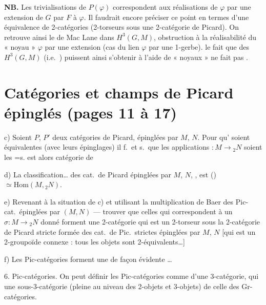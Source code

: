 \documentclass[11pt,a4paper]{article}
\begin{document}
\textbf{NB.} Les trivialisations de $P(\varphi)$ correspondent aux
réalisations de $\varphi$ par une extension de $G$ par $F$
 à $\varphi$. Il faudrait encore préciser ce point
en termes d'une équivalence de 2-catégories (2-torseurs sous une
2-catégorie de Picard). On retrouve ainsi le  de Mac Lane
dans $H^3(G,M)$, obstruction à la réalisabilité du « noyau » $\varphi$ par
une extension (cas  du lien $\varphi$ par une
1-gerbe).  le fait que  des
$H^3(G,M)$ (i.e.\ ) puissent ainsi s'obtenir à l'aide de « noyaux » ne fait pas
.

\section*{Catégories et champs de Picard épinglés (pages 11 à 17)}

c) Soient $P$, $P'$ deux catégories de Picard, épinglées par $M$, $N$. Pour
qu' soient équivalentes (avec leurs épinglages) il f.\ et
s.\ que les applications  $: M \to
{}_2N$ soient les =s.  est alors
 catégorie de 

d) La classification\ldots{} des cat.\ de Picard épinglées par $M$, $N$,
, est () $\simeq
\mathrm{Hom}(M, {}_2N)$.

e) Revenant à la situation de c) et utilisant la multiplication de Baer des
Pic-cat.\ épinglées par $(M,N)$ — trouver que celles qui correspondent à un
$\sigma : M \to {}_2N$ donné forment une 2-catégorie qui est un 2-torseur
sous la 2-catégorie de Picard stricte formée des cat.\ de Pic.\ strictes
épinglées par $M$, $N$ [qui est un 2-groupoïde connexe : tous les objets
sont 2-équivalents\ldots]

f) Les Pic-catégories forment une  de façon
évidente  \ldots
{}

6. Pic-catégories. On peut définir les Pic-catégories comme  d'une 3-catégorie, qui  une sous-3-catégorie
(pleine au niveau des 2-objets et 3-objets) de celle des Gr-catégories.
\end{document}

